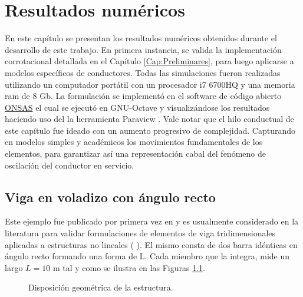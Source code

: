 \chapter{Resultados numéricos}\label{Cap:ResultadosNumericos}
\linenumbers
En este capítulo se presentan los resultados numéricos obtenidos durante el desarrollo de este trabajo. En primera instancia,  se valida la implementación corrotacional detallada en el Capítulo \ref{Cap:Preliminares}, para luego aplicarse a modelos específicos de conductores. Todas las simulaciones fueron realizadas utilizando un computador portátil con un procesador i7 6700HQ y una memoria ram de 8 Gb. La formulación se implementó en el software de código abierto \href{https://github.com/ONSAS/ONSAS/}{ONSAS} el cual se ejecutó en GNU-Octave  \textcite{eaton2007gnu}y visualizándose los resultados haciendo uso del la herramienta Paraview \textcite{ahrens2014image}. Vale notar que el hilo conductual de este capítulo fue ideado con un aumento progresivo de complejidad. Capturando en modelos simples y académicos los movimientos fundamentales de los elementos, para garantizar así una representación cabal del fenómeno de oscilación del conductor en servicio. 


\section{Viga en voladizo con ángulo recto}\label{Sec:RN:RightAngle}
Este ejemplo fue publicado por primera vez en \cite{simo1988dynamics} y es usualmente considerado en la literatura para validar formulaciones de elementos de viga tridimensionales aplicadas a estructuras no lineales (\cite{albino2018co} \cite{Le2014}). El mismo consta de dos barra idénticas en ángulo recto formando una forma de L. Cada miembro que la integra, mide un largo $L=10$ m tal y como se ilustra en las Figuras \ref{fig:RN:RA:esquemas}.


\begingroup
\centering
\begin{figure}[htbp]
	\centering
	\label{fig:RN:RA:Ilusxy}
	\label{fig:RN:RA:Ilusyz}
	\caption{Disposición geométrica de la estructura.} 	\label{fig:RN:RA:esquemas}
\end{figure}
\endgroup



